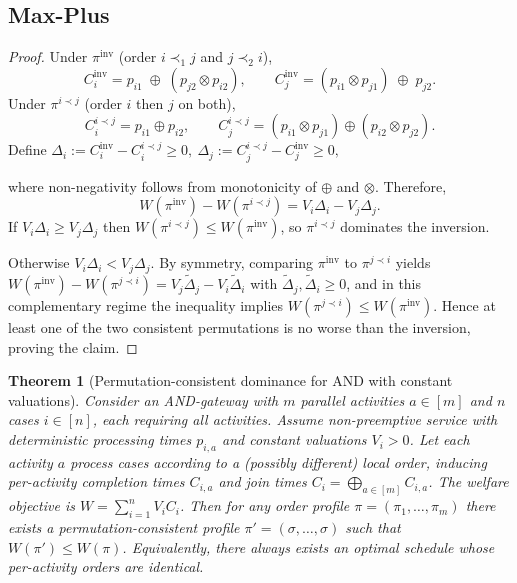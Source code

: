 \documentclass[letterpaper]{article}
\newtheorem{theorem}{Theorem}
\begin{document}
\subsection{Max-Plus}

\begin{proof}
Under $\pi^{\mathrm{inv}}$ (order $i\prec_1 j$ and $j\prec_2 i$),
\[
C_i^{\mathrm{inv}} = p_{i1}\;\oplus\;(p_{j2}\otimes p_{i2}),\qquad
C_j^{\mathrm{inv}} = (p_{i1}\otimes p_{j1})\;\oplus\;p_{j2}.
\]
Under $\pi^{i\prec j}$ (order $i$ then $j$ on both),
\[
C_i^{i\prec j} = p_{i1}\oplus p_{i2},\qquad
C_j^{i\prec j} = (p_{i1}\otimes p_{j1})\oplus (p_{i2}\otimes p_{j2}).
\]
Define 
$\Delta_i:=C_i^{\mathrm{inv}}-C_i^{i\prec j}\ge 0 , \
\Delta_j:=C_j^{i\prec j}-C_j^{\mathrm{inv}}\ge 0,$

where non-negativity follows from monotonicity of $\oplus$ and $\otimes$.
Therefore,
\[
W(\pi^{\mathrm{inv}})-W(\pi^{i\prec j})
=V_i\Delta_i - V_j\Delta_j.
\]
If $V_i\Delta_i\ge V_j\Delta_j$ then $W(\pi^{i\prec j})\le W(\pi^{\mathrm{inv}})$,
so $\pi^{i\prec j}$ dominates the inversion.

Otherwise $V_i\Delta_i< V_j\Delta_j$. By symmetry, comparing $\pi^{\mathrm{inv}}$
to $\pi^{j\prec i}$ yields
$W(\pi^{\mathrm{inv}})-W(\pi^{j\prec i})=V_j\widetilde{\Delta}_j-V_i\widetilde{\Delta}_i$
with $\widetilde{\Delta}_j,\widetilde{\Delta}_i\ge 0$, and in this complementary
regime the inequality implies $W(\pi^{j\prec i})\le W(\pi^{\mathrm{inv}})$.
Hence at least one of the two consistent permutations is no worse than the
inversion, proving the claim.
\end{proof}

\begin{theorem}[Permutation-consistent dominance for AND with constant valuations]\label{thm:and-perm-m}
Consider an AND-gateway with $m$ parallel activities $a\in[m]$ and $n$ cases
$i\in[n]$, each requiring all activities. Assume non-preemptive service with
deterministic processing times $p_{i,a}$ and constant valuations $V_i>0$.
Let each activity $a$ process cases according to a (possibly different) local
order, inducing per-activity completion times $C_{i,a}$ and join times
$C_i=\bigoplus_{a\in[m]} C_{i,a}$. The welfare objective is
$W=\sum_{i=1}^n V_i C_i$.
Then for any order profile $\pi=(\pi_1,\ldots,\pi_m)$ there exists a
permutation-consistent profile $\pi'=(\sigma,\ldots,\sigma)$ such that
$W(\pi')\le W(\pi)$. Equivalently, there always exists an optimal schedule whose
per-activity orders are identical.
\end{theorem}
\end{document}
